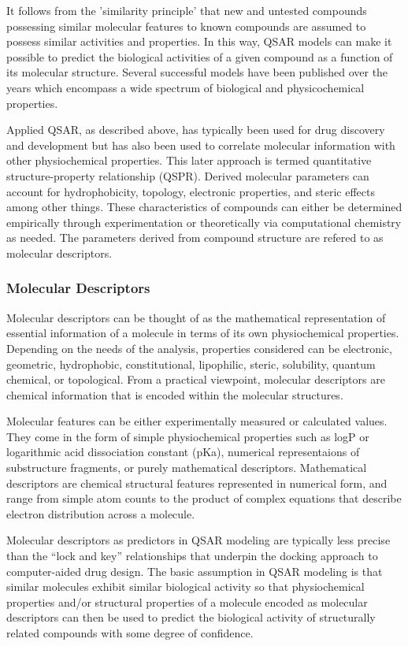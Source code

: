 It follows from the 'similarity principle' that new and untested compounds possessing similar molecular features to known compounds are assumed to possess similar activities and properties. In this way, QSAR models can make it possible to predict the biological activities of a given compound as a function of its molecular structure. Several successful models have been published over the years which encompass a wide spectrum of biological and physicochemical properties.

Applied QSAR, as described above, has typically been used for drug discovery and development but has also been used to correlate molecular information with other physiochemical properties. This later approach is termed quantitative structure-property relationship (QSPR). Derived molecular parameters can account for hydrophobicity, topology, electronic properties, and steric effects among other things. These characteristics of compounds can either be determined empirically through experimentation or theoretically via computational chemistry as needed. \cite{Nantasenamat2009} The parameters derived from compound structure are refered to as molecular descriptors.

\subsubsection{Molecular Descriptors}
Molecular descriptors can be thought of as the mathematical representation of essential information of a molecule in terms of its own physiochemical properties. Depending on the needs of the analysis, properties considered can be electronic, geometric, hydrophobic, constitutional, lipophilic, steric, solubility, quantum chemical, or topological. From a practical viewpoint, molecular descriptors are chemical information that is encoded within the molecular structures. \cite{Nantasenamat2009}

Molecular features can be either experimentally measured or calculated values. They come in the form of simple physiochemical properties such as logP or logarithmic acid dissociation constant (pKa), numerical representaions of substructure fragments, or purely mathematical descriptors. Mathematical descriptors are chemical structural features represented in numerical form, and range from simple atom counts to the product of complex equations that describe electron distribution across a molecule. \cite{Kruhlak2012}

Molecular descriptors as predictors in QSAR modeling are typically less precise than the “lock and key” relationships that underpin the docking approach to computer-aided drug design. The basic assumption in QSAR modeling is that similar molecules exhibit similar biological activity so that physiochemical properties and/or structural properties of a molecule encoded as molecular descriptors can then be used to predict the biological activity of structurally related compounds with some degree of confidence.


